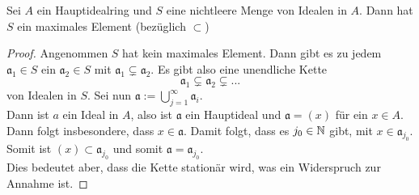 
	\begin{lem}
		Sei $A$ ein Hauptidealring und $S$ eine nichtleere Menge von Idealen in $A$. Dann hat $S$ ein maximales Element (bezüglich $\subset$)
	\end{lem}
	\begin{proof}
		Angenommen $S$ hat kein maximales Element. Dann gibt es zu jedem $\mathfrak a_1\in S$ ein $\mathfrak a_2\in S$ mit $\mathfrak a_1\subsetneq \mathfrak a_2$. Es gibt also eine unendliche Kette
		\[\mathfrak a_1\subsetneq \mathfrak a_2\subsetneq...\]
		von Idealen in $S$. Sei nun $\mathfrak a:=\bigcup_{j=1}^\infty \mathfrak a_i$.\\
		Dann ist $a$ ein Ideal in $A$, also ist $\mathfrak a$ ein Hauptideal und $\mathfrak a=(x)$ für ein $x\in A$.\\
		Dann folgt insbesondere, dass $x\in\mathfrak a$. Damit folgt, dass es $j_0\in\mathbb{N}$ gibt, mit $x\in \mathfrak a_{j_0}$.\\
		Somit ist $(x)\subset\mathfrak a_{j_0}$ und somit $\mathfrak a=\mathfrak a_{j_0}$.\\
		Dies bedeutet aber, dass die Kette stationär wird, was ein Widerspruch zur Annahme ist.
	\end{proof}
	
